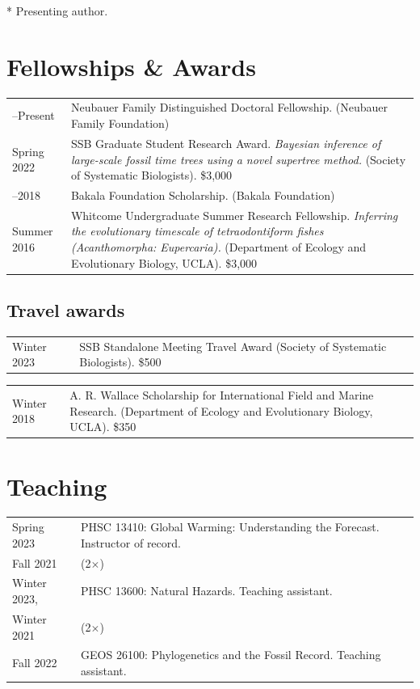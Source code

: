 \documentclass[10pt]{article}
\begin{document}
\hspace*{1.07cm} * Presenting author.

\section*{Fellowships \& Awards}

\begin{tabularx}{\textwidth}{>{\raggedleft\arraybackslash}p{2.2cm} X}
2018--Present & Neubauer Family Distinguished Doctoral Fellowship. (Neubauer Family Foundation) \\[0.1cm]
Spring 2022 & SSB Graduate Student Research Award. \textit{Bayesian inference of large-scale fossil time trees using a novel supertree method.} (Society of Systematic Biologists). \$3,000 \\[0.55cm]
2014--2018 & Bakala Foundation Scholarship. (Bakala Foundation) \\[0.1cm]
Summer 2016 & Whitcome Undergraduate Summer Research Fellowship. \textit{Inferring the evolutionary timescale of tetraodontiform fishes (Acanthomorpha: Eupercaria).} (Department of Ecology and Evolutionary Biology, UCLA). \$3,000
\end{tabularx}

\subsection*{Travel awards}

\begin{tabularx}{\textwidth}{>{\raggedleft\arraybackslash}p{2.2cm} X}
Winter 2023 & SSB Standalone Meeting Travel Award (Society of Systematic Biologists). \$500
\end{tabularx}
\begin{tabularx}{\textwidth}{>{\raggedleft\arraybackslash}p{2.2cm} X}
Winter 2018 & A. R. Wallace Scholarship for International Field and Marine Research. (Department of Ecology and Evolutionary Biology, UCLA). \$350
\end{tabularx}

\section*{Teaching}

\begin{tabularx}{\textwidth}{>{\raggedleft\arraybackslash}p{2.2cm} X}
Spring 2023 & PHSC 13410: Global Warming: Understanding the Forecast. Instructor of record. \\
Fall 2021 & (2$\times$) \\[0.15cm]
Winter 2023, & PHSC 13600: Natural Hazards. Teaching assistant. \\
Winter 2021 & (2$\times$) \\[0.15cm]
Fall 2022 & GEOS 26100: Phylogenetics and the Fossil Record. Teaching assistant.
\end{tabularx}
\end{document}
